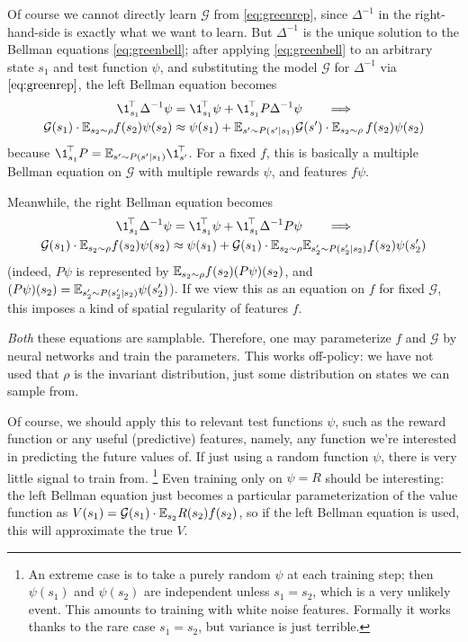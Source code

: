 \documentclass[11pt,a4paper]{article}
\newcommand{\green}{\mathcal{G}}
\begin{document}
Of course we cannot directly learn $\green$ from \eqref{eq:greenrep},
since $\Delta^{-1}$ in the right-hand-side is exactly what we want to
learn. But $\Delta^{-1}$ is the unique solution to the Bellman equations \eqref{eq:greenbell}; after
applying \eqref{eq:greenbell} to an arbitrary state $s_1$ and test
function $\psi$, and
substituting the model $\green$ for $\Delta^{-1}$ via
$\eqref{eq:greenrep}$, the left Bellman equation becomes
\begin{gather}
\transp{\1_{s_1}}\,\Delta^{-1}\psi=\transp{\1_{s_1}}\,\psi+\transp{\1_{s_1}}\,P\Delta^{-1}\psi
\qquad \Longrightarrow
\\
\green(s_1)\cdot\E_{s_2\sim \rho}
f(s_2)\psi(s_2)
\approx \psi(s_1)+ \E_{s'\sim P(s'|s_1)}\green(s')\cdot
\E_{s_2\sim \rho}\,
f(s_2)\psi(s_2)
\end{gather}
because $\transp{\1_{s_1}}\,P=\E_{s'\sim P(s'|s_1)}\transp{\1_{s'}}\,$.
For a fixed $f$, 
this is basically a multiple Bellman equation on $\green$ with multiple
rewards $\psi$, and features $f\psi$.

Meanwhile,
the right Bellman equation becomes
\begin{gather}
\transp{\1_{s_1}}\,\Delta^{-1}\psi=\transp{\1_{s_1}}\,\psi+\transp{\1_{s_1}}\,\Delta^{-1}P\psi
\qquad \Longrightarrow
\\
\green(s_1)\cdot\E_{s_2\sim \rho}
f(s_2)\psi(s_2)
\approx \psi(s_1)+ \green(s_1)\cdot\E_{s_2\sim \rho}\E_{s'_2\sim P(s'_2|s_2)}
f(s_2)\psi(s'_2)
\end{gather}
(indeed, 
$P\psi$ is
represented by $\mathbb{E}_{s_2\sim \rho} f(s_2)(P\psi)(s_2)$, and
$(P\psi)(s_2)=\mathbb{E}_{s'_2\sim P(s'_2|s_2)}\psi(s'_2)$). If we view this as
an equation on $f$ for fixed $\green$, this imposes a kind of spatial
regularity of features $f$.

\emph{Both} these equations are samplable. Therefore, one may
parameterize $f$ and $\green$ by neural networks and train the
parameters. This works off-policy: we have not used that $\rho$ is the
invariant distribution, just some distribution on states we can sample
from.

Of course, we should apply this to relevant test functions $\psi$,
such as the reward function or any useful (predictive) features, namely,
any function we're interested in predicting the future values of. 
If just using a
random function $\psi$, there is very little signal to train
from. \footnote{An extreme case is to take a purely random $\psi$ at each
training step; then $\psi(s_1)$ and $\psi(s_2)$ are independent unless $s_1=s_2$,
which is a very unlikely event. This amounts to training with white noise
features. Formally it works thanks to the rare case $s_1=s_2$, but
variance is just terrible.} Even training only on $\psi=R$ should be
interesting: the left Bellman equation just becomes a particular
parameterization of the value function as $V(s_1)=\green(s_1)\cdot
\E_{s_2} R(s_2)f(s_2)$, so if the left Bellman equation is used, this
will approximate the true $V$.
\end{document}
